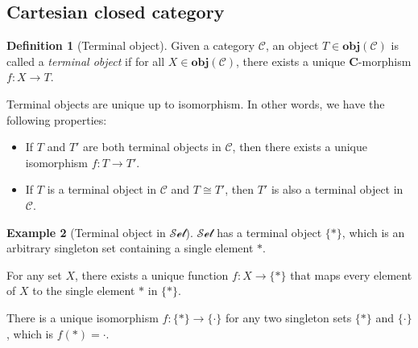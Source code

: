 \documentclass[12pt,a4paper]{report}
\theoremstyle{definition}
\newtheorem{definition}{Definition}[chapter]
\newtheorem{example}[definition]{Example}
\begin{document}
        \subsection{Cartesian closed category}
            \begin{definition}[Terminal object]
                Given a category $\mathcal{C}$, an object $T \in \textbf{obj}(\mathcal{C})$ is called a \emph{terminal object} if for all $X \in \textbf{obj}(\mathcal{C})$, there exists a unique \textbf{C}-morphism $f : X \to T$.
            \end{definition}
            Terminal objects are unique up to isomorphism. In other words, we have the following properties:
            \begin{itemize}
                \item 
                    If $T$ and $T'$ are both terminal objects in $\mathcal{C}$, then there exists a unique isomorphism $f : T \to T'$.
                \item
                    If $T$ is a terminal object in $\mathcal{C}$ and $T \cong T'$, then $T'$ is also a terminal object in $\mathcal{C}$.
            \end{itemize}
            \begin{example}[Terminal object in $\mathcal{Set}$]
                $\mathcal{Set}$ has a terminal object $\{\ast\}$, which is an arbitrary singleton set containing a single element $\ast$.

                For any set $X$, there exists a unique function $f : X \to \{\ast\}$ that maps every element of $X$ to the single element $\ast$ in $\{\ast\}$.
                
                There is a unique isomorphism $f : \{\ast\} \to \{\cdot\}$ for any two singleton sets $\{\ast\}$ and $\{\cdot\}$, which is $f(\ast) = \cdot$.
            \end{example}
\end{document}

